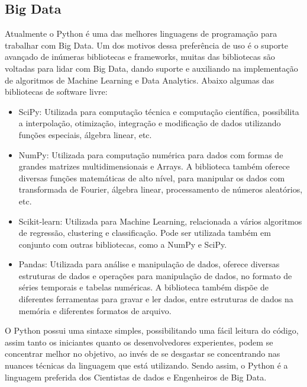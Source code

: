         \subsection{Big Data}
        Atualmente o Python é uma das melhores linguagens de programação para trabalhar com Big Data. Um dos motivos dessa preferência de uso é o suporte avançado de inúmeras bibliotecas e frameworks, muitas das bibliotecas são voltadas para lidar com Big Data, dando suporte e auxiliando na implementação de algoritmos de Machine Learning e Data Analytics. Abaixo algumas das bibliotecas de software livre:
        \begin{itemize}
        	\item SciPy: Utilizada para computação técnica e computação científica, possibilita a interpolação, otimização, integração e modificação de dados utilizando funções especiais, álgebra linear, etc.
        	
        	\item NumPy: Utilizada para computação numérica para dados com formas de grandes matrizes multidimensionais e Arrays. A biblioteca também oferece diversas funções matemáticas de alto nível, para manipular os dados com transformada de Fourier, álgebra linear, processamento de números aleatórios, etc.
        	
        	\item Scikit-learn: Utilizada para Machine Learning, relacionada a vários algoritmos de regressão, clustering e classificação. Pode ser utilizada também em conjunto com outras bibliotecas, como a NumPy e SciPy.
        	
        	\item Pandas: Utilizada para análise e manipulação de dados, oferece diversas estruturas de dados e operações para manipulação de dados, no formato de séries temporais e tabelas numéricas. A biblioteca também dispõe de diferentes ferramentas para gravar e ler dados, entre estruturas de dados na memória e diferentes formatos de arquivo.
        \end{itemize}
        
        O Python possui uma sintaxe simples, possibilitando uma fácil leitura do código, assim tanto os iniciantes quanto os desenvolvedores experientes, podem se concentrar melhor no objetivo, ao invés de se desgastar se concentrando nas nuances técnicas da linguagem que está utilizando. Sendo assim, o Python é a linguagem preferida dos Cientistas de dados e Engenheiros de Big Data. 
        
